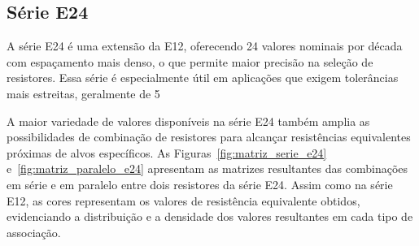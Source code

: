 \documentclass[conference]{IEEEtran}
\begin{document}






\subsection{Série E24}

A série E24 é uma extensão da E12, oferecendo 24 valores nominais por década com espaçamento mais denso, o que permite maior precisão na seleção de resistores. Essa série é especialmente útil em aplicações que exigem tolerâncias mais estreitas, geralmente de 5%

A maior variedade de valores disponíveis na série E24 também amplia as possibilidades de combinação de resistores para alcançar resistências equivalentes próximas de alvos específicos. As Figuras~\ref{fig:matriz_serie_e24} e~\ref{fig:matriz_paralelo_e24} apresentam as matrizes resultantes das combinações em série e em paralelo entre dois resistores da série E24. Assim como na série E12, as cores representam os valores de resistência equivalente obtidos, evidenciando a distribuição e a densidade dos valores resultantes em cada tipo de associação.
\end{document}
